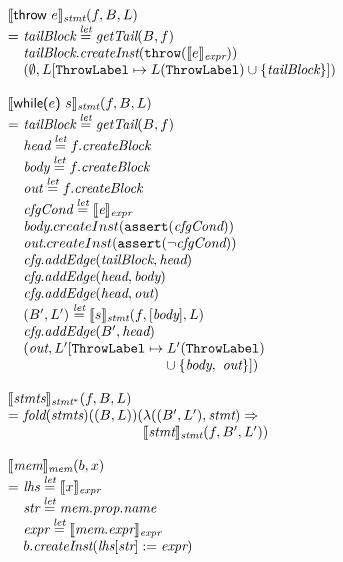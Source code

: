 \[
\begin{array}{l@{}l@{~}l}
\lefteqn{\transfun{\irthrow{e}}_{\emph{stmt}}(f, B, L)}\\
& = & \emph{tailBlock} \letval \getTail(B, f)\\
& & \emph{tailBlock}.\emph{createInst}(\TT{throw}(\transfun{e}_{\emph{expr}}))\\
& & (\emptyset, L[\ThrowLabel \mapsto L(\ThrowLabel) \cup \{ \emph{tailBlock} \}])\\
\\

\lefteqn{\transfun{\ircfgwhile{e}{s}}_{\emph{stmt}}(f, B, L)}\\
& = & \emph{tailBlock} \letval \getTail(B, f)\\
& & \emph{head} \letval f.\emph{createBlock}\\
& & \emph{body} \letval f.\emph{createBlock}\\
& & \emph{out} \letval f.\emph{createBlock}\\
& & \emph{cfgCond} \letval \transfun{\emph{e}}_{\emph{expr}}\\
& & \emph{body}.createInst(\TT{assert}(\emph{cfgCond}))\\
& & \emph{out}.createInst(\TT{assert}(\neg \emph{cfgCond}))\\
& & \emph{cfg}.\emph{addEdge}(\emph{tailBlock}, \emph{head})\\
& & \emph{cfg}.\emph{addEdge}(\emph{head}, \emph{body})\\
& & \emph{cfg}.\emph{addEdge}(\emph{head}, \emph{out})\\
& & (B', L') \letval \transfun{s}_{\emph{stmt}}(f, [\emph{body}], L)\\
& & \emph{cfg}.\emph{addEdge}(B', \emph{head})\\
& & (\emph{out}, L'[\ThrowLabel \mapsto L'(\ThrowLabel)\\
& & \phantom{(\emph{out}, L'[\ThrowLabel \mapsto } \cup \{ \emph{body},\ \emph{out} \}]) \\
& & \\

\lefteqn{\transfun{\emph{stmts}}_{\emph{stmt}^{*}}(f, B, L)}\\
& = & \fold(\emph{stmts})((B, L))(\lambda((B', L'), \emph{stmt}) \Rightarrow\\
&& \phantom{\fold(\emph{stmts})((B, L))(} \transfun{\emph{stmt}}_{\emph{stmt}}(f, B', L'))\\
& & \\

\lefteqn{\transfun{\emph{mem}}_{\emph{mem}}(b, x)}\\
& = & \emph{lhs} \letval \transfun{x}_{\emph{expr}}\\
& & \emph{str} \letval \emph{mem}.\emph{prop}.\emph{name}\\
& & \emph{expr} \letval \transfun{\emph{mem}.\emph{expr}}_{\emph{expr}}\\
& & b.\emph{createInst}(\emph{lhs}[\emph{str}] := \emph{expr})\\
& & \\


\end{array}\]
